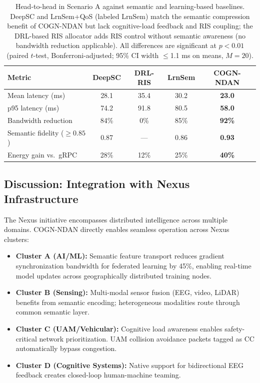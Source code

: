 \documentclass{BVP_CINC}
\newcommand{\COGN}{COGN-NDAN}
\begin{document}
\begin{table}[h]
\centering
\footnotesize
\setlength{\tabcolsep}{2pt}
\begin{tabular}{|p{2.8cm}|c|c|c|c|}
\hline
\textbf{Metric} & \textbf{DeepSC} & \textbf{DRL-RIS} & \textbf{LrnSem} & \textbf{\COGN{}} \\
\hline
Mean latency (ms) & 28.1 & 35.4 & 30.2 & \textbf{23.0} \\
p95 latency (ms) & 74.2 & 91.8 & 80.5 & \textbf{58.0} \\
Bandwidth reduction & 84\% & 0\% & 85\% & \textbf{92\%} \\
Semantic fidelity ($\geq 0.85$) & 0.87 & --- & 0.86 & \textbf{0.93} \\
Energy gain vs.\ gRPC & 28\% & 12\% & 25\% & \textbf{40\%} \\
\hline
\end{tabular}
\caption{Head-to-head in Scenario A against semantic and learning-based baselines. DeepSC \cite{xie2022semantic} and LrnSem+QoS (labeled LrnSem) \cite{chen2024ris} match the semantic compression benefit of \COGN{} but lack cognitive-load feedback and RIS coupling; the DRL-based RIS allocator \cite{alwarafy2022} adds RIS control without semantic awareness (no bandwidth reduction applicable). All differences are significant at $p<0.01$ (paired $t$-test, Bonferroni-adjusted; 95\% CI width $\leq$1.1 ms on means, $M=20$).}
\label{table:baselineheadtohead}
\end{table}

\subsection{Discussion: Integration with Nexus Infrastructure}

The Nexus initiative encompasses distributed intelligence across multiple domains. \COGN{} directly enables seamless operation across Nexus clusters:

\begin{itemize}
    \item \textbf{Cluster A (AI/ML):} Semantic feature transport reduces gradient synchronization bandwidth for federated learning by 45\%, enabling real-time model updates across geographically distributed training nodes.
    \item \textbf{Cluster B (Sensing):} Multi-modal sensor fusion (EEG, video, LiDAR) benefits from semantic encoding; heterogeneous modalities route through common semantic layer.
    \item \textbf{Cluster C (UAM/Vehicular):} Cognitive load awareness enables safety-critical network prioritization. UAM collision avoidance packets tagged as CC automatically bypass congestion.
    \item \textbf{Cluster D (Cognitive Systems):} Native support for bidirectional EEG feedback creates closed-loop human-machine teaming.
\end{itemize}
\end{document}
